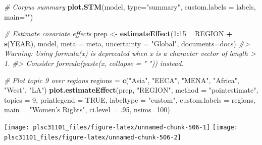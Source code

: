 \documentclass[
]{book}
\newenvironment{Shaded}{\begin{snugshade}}{\end{snugshade}}
\newcommand{\CommentTok}[1]{\textcolor[rgb]{0.56,0.35,0.01}{\textit{#1}}}
\newcommand{\DataTypeTok}[1]{\textcolor[rgb]{0.13,0.29,0.53}{#1}}
\newcommand{\DecValTok}[1]{\textcolor[rgb]{0.00,0.00,0.81}{#1}}
\newcommand{\FloatTok}[1]{\textcolor[rgb]{0.00,0.00,0.81}{#1}}
\newcommand{\KeywordTok}[1]{\textcolor[rgb]{0.13,0.29,0.53}{\textbf{#1}}}
\newcommand{\NormalTok}[1]{#1}
\newcommand{\OperatorTok}[1]{\textcolor[rgb]{0.81,0.36,0.00}{\textbf{#1}}}
\newcommand{\OtherTok}[1]{\textcolor[rgb]{0.56,0.35,0.01}{#1}}
\newcommand{\StringTok}[1]{\textcolor[rgb]{0.31,0.60,0.02}{#1}}
\begin{document}
\begin{Shaded}
\begin{Highlighting}[]
\CommentTok{# Corpus summary}
\KeywordTok{plot.STM}\NormalTok{(model, }\DataTypeTok{type=}\StringTok{"summary"}\NormalTok{, }\DataTypeTok{custom.labels =}\NormalTok{ labels, }\DataTypeTok{main=}\StringTok{""}\NormalTok{)}

\CommentTok{# Estimate covariate effects}
\NormalTok{prep <-}\StringTok{ }\KeywordTok{estimateEffect}\NormalTok{(}\DecValTok{1}\OperatorTok{:}\DecValTok{15} \OperatorTok{~}\StringTok{ }\NormalTok{REGION }\OperatorTok{+}\StringTok{ }\KeywordTok{s}\NormalTok{(YEAR), model, }\DataTypeTok{meta =}\NormalTok{ meta, }\DataTypeTok{uncertainty =} \StringTok{"Global"}\NormalTok{, }\DataTypeTok{documents=}\NormalTok{docs)}
\CommentTok{#> Warning: Using formula(x) is deprecated when x is a character vector of length > 1.}
\CommentTok{#>   Consider formula(paste(x, collapse = " ")) instead.}

\CommentTok{# Plot topic 9 over regions}
\NormalTok{regions =}\StringTok{ }\KeywordTok{c}\NormalTok{(}\StringTok{"Asia"}\NormalTok{, }\StringTok{"EECA"}\NormalTok{, }\StringTok{"MENA"}\NormalTok{, }\StringTok{"Africa"}\NormalTok{, }\StringTok{"West"}\NormalTok{, }\StringTok{"LA"}\NormalTok{)}
\KeywordTok{plot.estimateEffect}\NormalTok{(prep, }\StringTok{"REGION"}\NormalTok{, }\DataTypeTok{method =} \StringTok{"pointestimate"}\NormalTok{, }\DataTypeTok{topics =} \DecValTok{9}\NormalTok{, }\DataTypeTok{printlegend =} \OtherTok{TRUE}\NormalTok{, }\DataTypeTok{labeltype =} \StringTok{"custom"}\NormalTok{, }\DataTypeTok{custom.labels =}\NormalTok{ regions, }\DataTypeTok{main =} \StringTok{"Women's Rights"}\NormalTok{, }\DataTypeTok{ci.level =} \FloatTok{.95}\NormalTok{, }\DataTypeTok{nsims=}\DecValTok{100}\NormalTok{)}
\end{Highlighting}
\end{Shaded}

\begin{center}\texttt{[image: plsc31101\_files/figure-latex/unnamed-chunk-506-1]} \texttt{[image: plsc31101\_files/figure-latex/unnamed-chunk-506-2]} \end{center}
\end{document}
